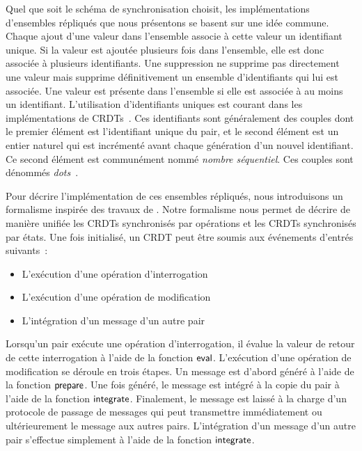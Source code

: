 Quel que soit le schéma de synchronisation choisit, les implémentations d'ensembles répliqués que nous présentons se basent sur une idée commune.
Chaque ajout d'une valeur dans l'ensemble associe à cette valeur un identifiant unique.
Si la valeur est ajoutée plusieurs fois dans l'ensemble, elle est donc associée à plusieurs identifiants.
Une suppression ne supprime pas directement une valeur mais supprime définitivement un ensemble d'identifiants qui lui est associée.
Une valeur est présente dans l'ensemble si elle est associée à au moins un identifiant.
L'utilisation d'identifiants uniques est courant dans les implémentations de \acp{CRDT}~\autocite{baquero_2018_pure-op-crdt,almeida_2018_delta-crdt-revisited}.
Ces identifiants sont généralement des couples dont le premier élément est l'identifiant unique du pair, et le second élément est un entier naturel qui est incrémenté avant chaque génération d'un nouvel identifiant.
Ce second élément est communément nommé \emph{nombre séquentiel}.
Ces couples sont dénommés \emph{dots}~\autocite{baquero_2018_pure-op-crdt}.

Pour décrire l'implémentation de ces ensembles répliqués, nous introduisons un formalisme inspirée des travaux de \textcite{baquero_2018_pure-op-crdt}.
Notre formalisme nous permet de décrire de manière unifiée les \acp{CRDT} synchronisés par opérations et les \acp{CRDT} synchronisés par états.
Une fois initialisé, un \ac{CRDT} peut être soumis aux événements d'entrés suivants~:
\begin{itemize}
\item L'exécution d'une opération d'interrogation
\item L'exécution d'une opération de modification
\item L'intégration d'un message d'un autre pair
\end{itemize}

Lorsqu'un pair exécute une opération d'interrogation, il évalue la valeur de retour de cette interrogation à l'aide de la fonction $\operatorname{\mathsf{eval}}$.
L'exécution d'une opération de modification se déroule en trois étapes.
Un message est d'abord généré à l'aide de la fonction $\operatorname{\mathsf{prepare}}$.
Une fois généré, le message est intégré à la copie du pair à l'aide de la fonction $\operatorname{\mathsf{integrate}}$.
Finalement, le message est laissé à la charge d'un protocole de passage de messages qui peut transmettre immédiatement ou ultérieurement le message aux autres pairs.
L'intégration d'un message d'un autre pair s'effectue simplement à l'aide de la fonction $\operatorname{\mathsf{integrate}}$.

